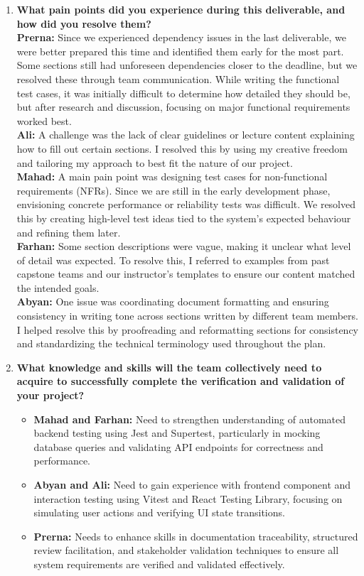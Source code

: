 \documentclass[12pt, titlepage]{article}
\begin{document}
\begin{enumerate}
  \item \textbf{What pain points did you experience during this deliverable, and how did you resolve them?} \\[3pt]
  \textbf{Prerna:} Since we experienced dependency issues in the last deliverable, we were better prepared this time and identified them early for the most part. Some sections still had unforeseen dependencies closer to the deadline, but we resolved these through team communication. While writing the functional test cases, it was initially difficult to determine how detailed they should be, but after research and discussion, focusing on major functional requirements worked best.\\[5pt]
  \textbf{Ali:} A challenge was the lack of clear guidelines or lecture content explaining how to fill out certain sections. I resolved this by using my creative freedom and tailoring my approach to best fit the nature of our project.\\[5pt]
  \textbf{Mahad:} A main pain point was designing test cases for non-functional requirements (NFRs). Since we are still in the early development phase, envisioning concrete performance or reliability tests was difficult. We resolved this by creating high-level test ideas tied to the system’s expected behaviour and refining them later.\\[5pt]
  \textbf{Farhan:} Some section descriptions were vague, making it unclear what level of detail was expected. To resolve this, I referred to examples from past capstone teams and our instructor’s templates to ensure our content matched the intended goals.\\[5pt]
  \textbf{Abyan:} One issue was coordinating document formatting and ensuring consistency in writing tone across sections written by different team members. I helped resolve this by proofreading and reformatting sections for consistency and standardizing the technical terminology used throughout the plan.

  \item \textbf{What knowledge and skills will the team collectively need to acquire to successfully complete the verification and validation of your project?} \\[3pt]
  \begin{itemize}
    \item \textbf{Mahad and Farhan:} Need to strengthen understanding of automated backend testing using Jest and Supertest, particularly in mocking database queries and validating API endpoints for correctness and performance.
    \item \textbf{Abyan and Ali:} Need to gain experience with frontend component and interaction testing using Vitest and React Testing Library, focusing on simulating user actions and verifying UI state transitions.
    \item \textbf{Prerna:} Needs to enhance skills in documentation traceability, structured review facilitation, and stakeholder validation techniques to ensure all system requirements are verified and validated effectively.
  \end{itemize}


\end{enumerate}
\end{document}
